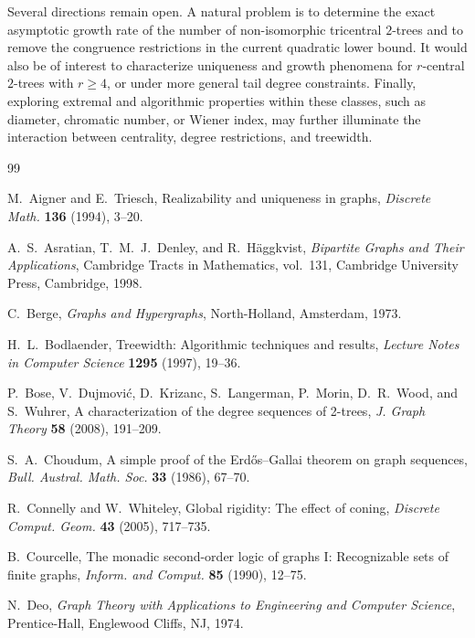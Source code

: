 \documentclass[12pt]{article}
\numberwithin{equation}{section}
\begin{document}
Several directions remain open.
A natural problem is to determine the exact asymptotic growth rate of the number of non-isomorphic tricentral $2$-trees and to remove the congruence restrictions in the current quadratic lower bound.
It would also be of interest to characterize uniqueness and growth phenomena for $r$-central $2$-trees with $r\ge 4$, or under more general tail degree constraints.
Finally, exploring extremal and algorithmic properties within these classes, such as diameter, chromatic number, or Wiener index, may further illuminate the interaction between centrality, degree restrictions, and treewidth.

\begin{thebibliography}{99}

M.~Aigner and E.~Triesch,
\newblock Realizability and uniqueness in graphs,
\newblock \emph{Discrete Math.} \textbf{136} (1994), 3--20.

A.~S.~Asratian, T.~M.~J.~Denley, and R.~H\"aggkvist,
\newblock \emph{Bipartite Graphs and Their Applications},
\newblock Cambridge Tracts in Mathematics, vol.~131, Cambridge University Press, Cambridge, 1998.

C.~Berge,
\newblock \emph{Graphs and Hypergraphs},
\newblock North-Holland, Amsterdam, 1973.

H.~L.~Bodlaender,
\newblock Treewidth: Algorithmic techniques and results,
\newblock \emph{Lecture Notes in Computer Science} \textbf{1295} (1997), 19--36.

P.~Bose, V.~Dujmovi\'c, D.~Krizanc, S.~Langerman, P.~Morin, D.~R.~Wood, and S.~Wuhrer,
\newblock A characterization of the degree sequences of 2-trees,
\newblock \emph{J. Graph Theory} \textbf{58} (2008), 191--209.

S.~A.~Choudum,
\newblock A simple proof of the Erd\H{o}s--Gallai theorem on graph sequences,
\newblock \emph{Bull. Austral. Math. Soc.} \textbf{33} (1986), 67--70.

R.~Connelly and W.~Whiteley,
\newblock Global rigidity: The effect of coning,
\newblock \emph{Discrete Comput. Geom.} \textbf{43} (2005), 717--735.

B.~Courcelle,
\newblock The monadic second-order logic of graphs I: Recognizable sets of finite graphs,
\newblock \emph{Inform. and Comput.} \textbf{85} (1990), 12--75.

N.~Deo,
\newblock \emph{Graph Theory with Applications to Engineering and Computer Science},
\newblock Prentice-Hall, Englewood Cliffs, NJ, 1974.


\end{thebibliography}
\end{document}
